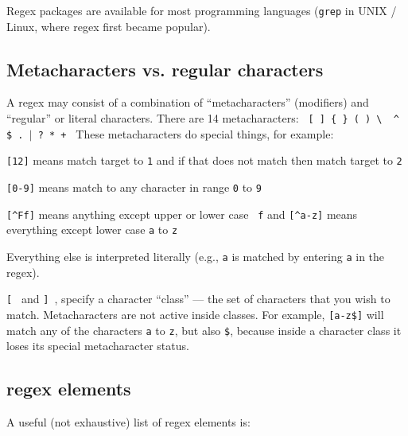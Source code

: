Regex packages are available for most programming languages ({\tt grep} 
in UNIX / Linux, where regex first became popular).

\subsection{Metacharacters vs. regular characters}
A regex may consist of a combination of ``metacharacters'' (modifiers) 
and ``regular'' or literal characters. There are 14 metacharacters: {\tt 
[ ] \{ \} ( ) \textbackslash~ \^{} \$ . $\vert$ ? * + }     
These metacharacters do special things, for example:
\begin{compactitem}
	\item {\tt [12]} means match target to {\tt 1} and if that does not match
then match target to {\tt 2}
	\item {\tt [0-9]} means match to any character in range {\tt 0} to 
	{\tt 9}
	\item {\tt [\^{}Ff]} means anything except upper or lower case {\tt 
	f} and 
	{\tt [\^{}a-z]} means everything except lower case {\tt a} to {\tt z}
\end{compactitem}
Everything else is interpreted literally (e.g., {\tt a} is matched by 
entering {\tt a} in the regex). 

{\tt [ } and {\tt ] }, specify a character ``class'' --- the set of 
characters that you wish to match. Metacharacters are not active inside 
classes. For example, {\tt [a-z\$]} will match any of the characters 
{\tt a} to {\tt z}, but also {\tt \$}, because inside a character class 
it loses its special metacharacter status.

\subsection {regex elements}

A useful (not exhaustive) list of regex elements is: 

